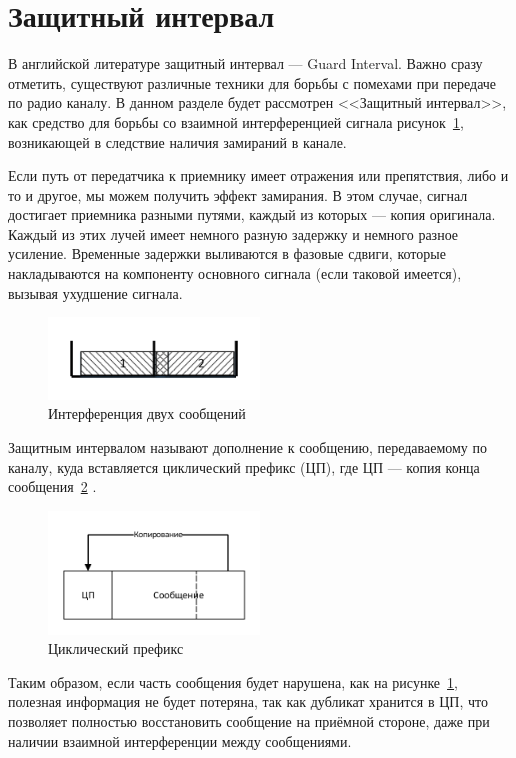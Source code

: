 \section{Защитный интервал}
В английской литературе защитный интервал --- Guard Interval.
Важно сразу отметить, существуют различные техники для борьбы с помехами при передаче по радио 
каналу. В данном разделе будет рассмотрен <<Защитный интервал>>, как средство для борьбы со взаимной
интерференцией сигнала рисунок~\ref{fig:kov_interf}, возникающей в следствие наличия замираний в канале.

Если путь от передатчика к приемнику имеет отражения или 
препятствия, либо и то и другое, мы можем получить эффект замирания. В этом случае, сигнал достигает
приемника разными путями, каждый из которых --- копия оригинала. Каждый из этих лучей имеет
немного разную задержку и немного разное усиление. Временные задержки выливаются в
фазовые сдвиги, которые накладываются на компоненту основного сигнала (если таковой
имеется), вызывая ухудшение сигнала.

\begin{figure}[H]
    \centering
    \includegraphics[width=0.5\textwidth]{img/kov_interf}
    \caption{Интерференция двух сообщений}
    \label{fig:kov_interf}
\end{figure}

Защитным интервалом называют дополнение к сообщению, передаваемому по каналу, куда вставляется
циклический префикс (ЦП), где ЦП --- копия конца сообщения~\ref{fig:kov_CP} .

\begin{figure}[H]
    \centering
    \includegraphics[width=0.5\textwidth]{img/kov_CP}
    \caption{Циклический префикс}
    \label{fig:kov_CP}
\end{figure}

Таким образом, если часть сообщения будет нарушена, как на рисунке~\ref{fig:kov_interf}, полезная 
информация не будет потеряна, так как дубликат хранится в ЦП, что позволяет полностью восстановить
сообщение на приёмной стороне, даже при наличии взаимной интерференции между сообщениями.